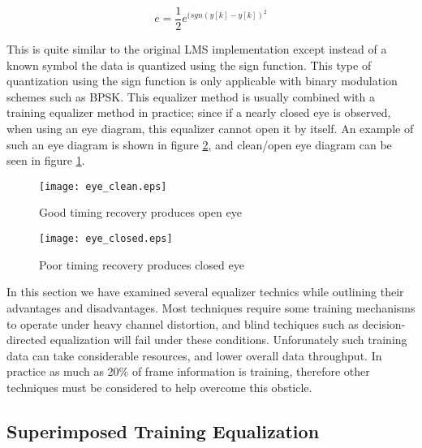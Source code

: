 \begin{equation}\label{dd_eq}
e = \frac{1}{2}e^{(sgn(y[k]-y[k])^{2}}
\end{equation}

This is quite similar to the original LMS implementation except instead of a known symbol the data is quantized using the sign function.  This type of quantization using the sign function is only applicable with binary modulation schemes such as BPSK.  This equalizer method is usually combined with a training equalizer method in practice; since if a nearly closed eye is observed, when using an eye diagram, this equalizer cannot open it by itself.  An example of such an eye diagram is shown in figure \ref{eye_closed}, and clean/open eye diagram can be seen in figure \ref{eye_clean}.\\

\begin{figure}\label{eye_clean}
\centering
\texttt{[image: eye\_clean.eps]}
\caption{Good timing recovery produces open eye}
\end{figure}

\begin{figure}\label{eye_closed}
\centering
\texttt{[image: eye\_closed.eps]}
\caption{Poor timing recovery produces closed eye}
\end{figure}

In this section we have examined several equalizer technics while outlining their advantages and disadvantages.  Most techniques require some training mechanisms to operate under heavy channel distortion, and blind techiques such as decision-directed equalization will fail under these conditions.  Unforunately such training data can take considerable resources, and lower overall data throughput.  In practice as much as 20\% of frame information is training, therefore other techniques must be considered to help overcome this obsticle.\\


\subsection{Superimposed Training Equalization}

